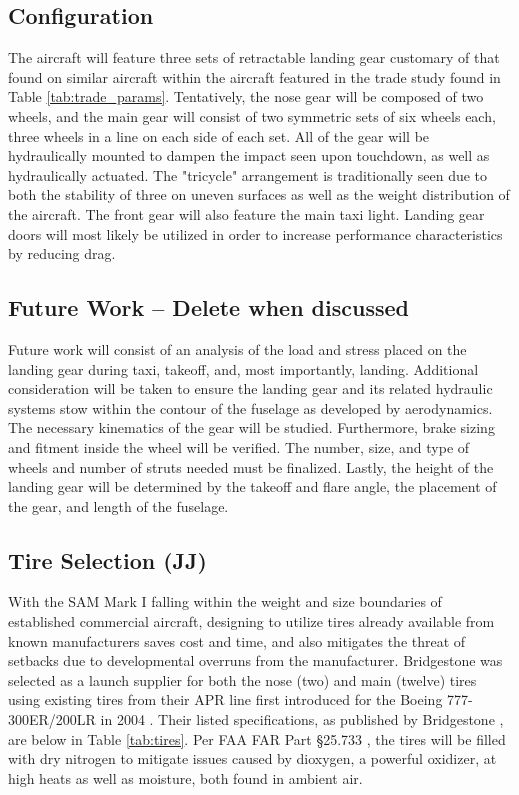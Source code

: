 \subsection{Configuration}
The aircraft will feature three sets of retractable landing gear customary of that found on similar aircraft within the aircraft featured in the trade study found in Table \ref{tab:trade_params}. Tentatively, the nose gear will be composed of two wheels, and the main gear will consist of two symmetric sets of six wheels each, three wheels in a line on each side of each set.  All of the gear will be hydraulically mounted to dampen the impact seen upon touchdown, as well as hydraulically actuated. The "tricycle" arrangement is traditionally seen due to both the stability of three on uneven surfaces as well as the weight distribution of the aircraft.  The front gear will also feature the main taxi light. Landing gear doors will most likely be utilized in order to increase performance characteristics by reducing drag. 

\subsection{Future Work -- Delete when discussed}
Future work will consist of an analysis of the load and stress placed on the landing gear during taxi, takeoff, and, most importantly, landing.  Additional consideration will be taken to ensure the landing gear and its related hydraulic systems stow within the contour of the fuselage as developed by aerodynamics. The necessary kinematics of the gear will be studied. Furthermore, brake sizing and fitment inside the wheel will be verified. The number, size, and type of wheels and number of struts needed must be finalized. Lastly, the height of the landing gear will be determined by the takeoff and flare angle, the placement of the gear, and length of the fuselage.

\subsection{Tire Selection (JJ)}
With the SAM Mark I falling within the weight and size boundaries of established commercial aircraft, designing to utilize tires already available from known manufacturers saves cost and time, and also mitigates the threat of setbacks due to developmental overruns from the manufacturer. Bridgestone was selected as a launch supplier for both the nose (two) and main (twelve) tires using existing tires from their APR line first introduced for the Boeing 777-300ER/200LR in 2004 \cite{bridgestonetire}.  Their listed specifications, as published by Bridgestone \cite{bridgestonetire}, are below in Table \ref{tab:tires}.  Per FAA FAR Part §25.733 \cite{cfr}, the tires will be filled with dry nitrogen to mitigate issues caused by dioxygen, a powerful oxidizer, at high heats as well as moisture, both found in ambient air. 

